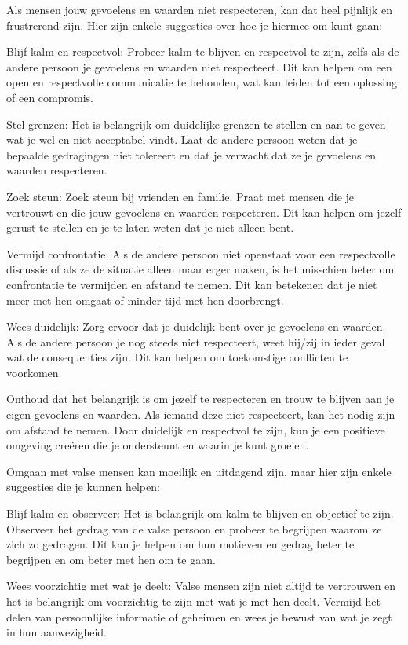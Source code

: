 Als mensen jouw gevoelens en waarden niet respecteren, kan dat heel pijnlijk en frustrerend zijn. Hier zijn enkele suggesties over hoe je hiermee om kunt gaan:

Blijf kalm en respectvol: Probeer kalm te blijven en respectvol te zijn, zelfs als de andere persoon je gevoelens en waarden niet respecteert. Dit kan helpen om een open en respectvolle communicatie te behouden, wat kan leiden tot een oplossing of een compromis.

Stel grenzen: Het is belangrijk om duidelijke grenzen te stellen en aan te geven wat je wel en niet acceptabel vindt. Laat de andere persoon weten dat je bepaalde gedragingen niet tolereert en dat je verwacht dat ze je gevoelens en waarden respecteren.

Zoek steun: Zoek steun bij vrienden en familie. Praat met mensen die je vertrouwt en die jouw gevoelens en waarden respecteren. Dit kan helpen om jezelf gerust te stellen en je te laten weten dat je niet alleen bent.

Vermijd confrontatie: Als de andere persoon niet openstaat voor een respectvolle discussie of als ze de situatie alleen maar erger maken, is het misschien beter om confrontatie te vermijden en afstand te nemen. Dit kan betekenen dat je niet meer met hen omgaat of minder tijd met hen doorbrengt.

Wees duidelijk: Zorg ervoor dat je duidelijk bent over je gevoelens en waarden. Als de andere persoon je nog steeds niet respecteert, weet hij/zij in ieder geval wat de consequenties zijn. Dit kan helpen om toekomstige conflicten te voorkomen.

Onthoud dat het belangrijk is om jezelf te respecteren en trouw te blijven aan je eigen gevoelens en waarden. Als iemand deze niet respecteert, kan het nodig zijn om afstand te nemen. Door duidelijk en respectvol te zijn, kun je een positieve omgeving creëren die je ondersteunt en waarin je kunt groeien.

Omgaan met valse mensen kan moeilijk en uitdagend zijn, maar hier zijn enkele suggesties die je kunnen helpen:

Blijf kalm en observeer: Het is belangrijk om kalm te blijven en objectief te zijn. Observeer het gedrag van de valse persoon en probeer te begrijpen waarom ze zich zo gedragen. Dit kan je helpen om hun motieven en gedrag beter te begrijpen en om beter met hen om te gaan.

Wees voorzichtig met wat je deelt: Valse mensen zijn niet altijd te vertrouwen en het is belangrijk om voorzichtig te zijn met wat je met hen deelt. Vermijd het delen van persoonlijke informatie of geheimen en wees je bewust van wat je zegt in hun aanwezigheid.

